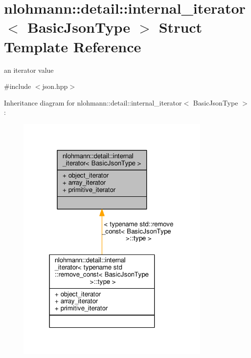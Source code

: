 \hypertarget{structnlohmann_1_1detail_1_1internal__iterator}{}\section{nlohmann\+:\+:detail\+:\+:internal\+\_\+iterator$<$ Basic\+Json\+Type $>$ Struct Template Reference}
\label{structnlohmann_1_1detail_1_1internal__iterator}


an iterator value  




{\ttfamily \#include $<$json.\+hpp$>$}



Inheritance diagram for nlohmann\+:\+:detail\+:\+:internal\+\_\+iterator$<$ Basic\+Json\+Type $>$\+:
\nopagebreak
\begin{figure}[H]
\begin{center}
\leavevmode
\includegraphics[width=271pt]{structnlohmann_1_1detail_1_1internal__iterator__inherit__graph}
\end{center}
\end{figure}


